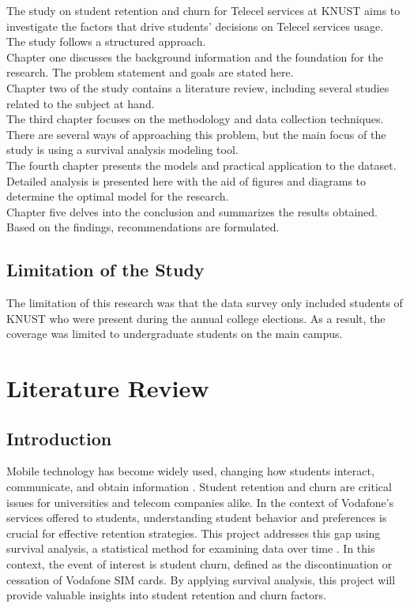 \documentclass[doublespacing]{report} %
\begin{document}
The study on student retention and churn for Telecel services at KNUST aims to investigate the factors that drive students' decisions on Telecel services usage. The study follows a structured approach.
\\Chapter one discusses the background information and the foundation for the research. The problem statement and goals are stated here.
\\Chapter two of the study contains a literature review, including several studies related to the subject at hand.
\\The third chapter focuses on the methodology and data collection techniques. There are several ways of approaching this problem, but the main focus of the study is using a survival analysis modeling tool.
\\The fourth chapter presents the models and practical application to the dataset. Detailed analysis is presented here with the aid of figures and diagrams to determine the optimal model for the research.
\\Chapter five delves into the conclusion and summarizes the results obtained. Based on the findings, recommendations are formulated.

\section{Limitation of the Study}

The limitation of this research was that the data survey only included students of KNUST who were present during the annual college elections. As a result, the coverage was limited to undergraduate students on the main campus.

\newpage
\chapter{Literature Review}


\section{Introduction}
Mobile technology has become widely used, changing how students interact, communicate, and obtain information \cite{Alqatani2020}. Student retention and churn are critical issues for universities and telecom companies alike. In the context of Vodafone's services offered to students, understanding student behavior and preferences is crucial for effective retention strategies. This project addresses this gap using survival analysis, a statistical method for examining data over time \cite{BoxSteffensmeier2020}. In this context, the event of interest is student churn, defined as the discontinuation or cessation of Vodafone SIM cards. By applying survival analysis, this project will provide valuable insights into student retention and churn factors.
\end{document}

